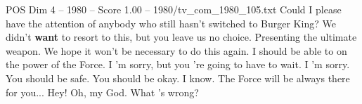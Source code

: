 \begin{textsample}{POS Dim 4 – 1980 – Score 1.00 – 1980/tv\_com\_1980\_105.txt}  \label{ex:f4_pos_062}
Could I please have the attention of anybody who still hasn't switched to Burger King?
We didn't \textbf{want} to resort to this, but you leave us no choice.
Presenting the ultimate weapon.
We hope it won't be necessary to do this again.
I should be able to on the power of the Force.
I 'm sorry, but you 're going to have to wait.
I 'm sorry.
You should be safe.
You should be okay.
I know.
The Force will be always there for you...
Hey!
Oh, my God.
What 's wrong?

\end{textsample}
